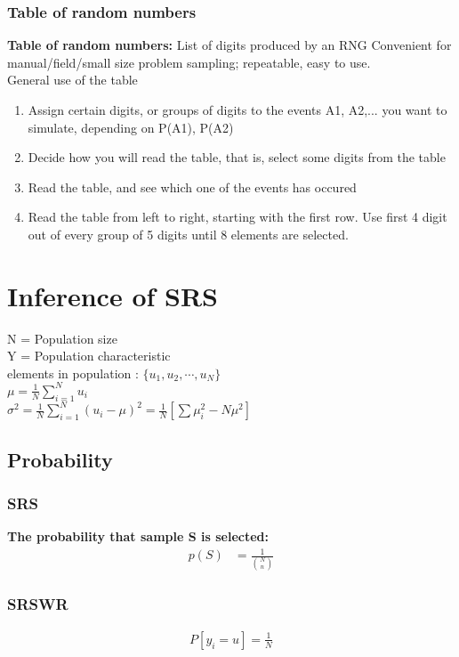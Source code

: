 \documentclass{article}
\theoremstyle{definition}
\theoremstyle{thrm}
\theoremstyle{lma}
\theoremstyle{ppst}
\theoremstyle{crlr}
\begin{document}
\subsubsection{Table of random numbers}
\textbf{Table of random numbers: }List of digits produced by an RNG Convenient for manual/field/small size problem sampling; repeatable, easy to use. \\
General use of the table
\begin{enumerate}
	\item Assign certain digits, or groups of digits to the events A1, A2,... you want to simulate, depending on P(A1), P(A2)
	\item Decide how you will read the table, that is, select some digits from the table
	\item Read the table, and see which one of the events has occured
	\item Read the table from left to right, starting with the first row. Use first 4 digit out of every group of 5 digits until 8 elements are selected.
\end{enumerate}

\section{Inference of SRS}
N = Population size\\
Y = Population characteristic\\
elements in population : $\{u_1,u_2,\cdots,u_N\}$\\
$\mu = \frac{1}{N}\sum_{i=1}^Nu_i$\\
$\sigma^2 = \frac{1}{N}\sum_{i=1}^N(u_i-\mu)^2 = \frac{1}{N}[\sum \mu_i^2-N\mu^2]$
\subsection{Probability}
\subsubsection{SRS}
\textbf{The probability that sample S is selected: }
\begin{align*}
	p(S) &= \frac{1}{{N \choose n}}
\end{align*}
\subsubsection{SRSWR}
\begin{align*}
	P[y_i=u] = \frac{1}{N}
\end{align*}
\end{document}
